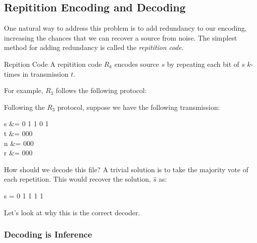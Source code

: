 \subsection{Repitition Encoding and Decoding}

One natural way to address this problem is to add redundancy to our encoding,
increasing the chances that we can recover a source from noise.
The simplest method for adding redundancy is called the \textit{repitition code}.

\begin{defn}{Repition Code}{}
A repitition code $R_k$ encodes source $s$ by repeating each bit of $s$ $k$-times
in transmission $t$.	

\medskip
For example, $R_3$ follows the following protocol:

\medskip
\begin{center}
\end{center}

\end{defn}

Following the $R_3$ protocol, suppose we have the following transmission:
\begin{frml}
	s &= 0 1 1 0 1 \\
	t &= 000 \\
	n &= 000 \\
	r &= 000 \\
\end{frml}

How should we decode this file? A trivial solution is to take the majority
vote of each repetition. This would recover the solution, $\hat s$ as:
\begin{frml}
	\hat s = 0 1 1 1 1
\end{frml}
Let's look at why this is the correct decoder.

\subsubsection{Decoding is Inference}

